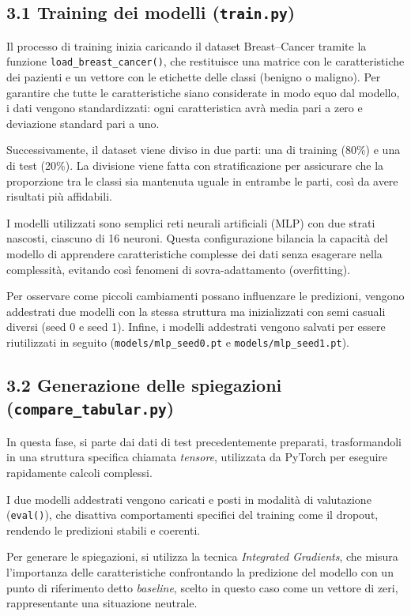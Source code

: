 \documentclass[a4paper,11pt]{article}
\begin{document}
\subsection*{3.1 Training dei modelli (\texttt{train.py})}
Il processo di training inizia caricando il dataset Breast–Cancer tramite la funzione \texttt{load\_breast\_cancer()}, che restituisce una matrice con le caratteristiche dei pazienti e un vettore con le etichette delle classi (benigno o maligno). Per garantire che tutte le caratteristiche siano considerate in modo equo dal modello, i dati vengono standardizzati: ogni caratteristica avrà media pari a zero e deviazione standard pari a uno.

Successivamente, il dataset viene diviso in due parti: una di training (80\%) e una di test (20\%). La divisione viene fatta con stratificazione per assicurare che la proporzione tra le classi sia mantenuta uguale in entrambe le parti, così da avere risultati più affidabili.

I modelli utilizzati sono semplici reti neurali artificiali (MLP) con due strati nascosti, ciascuno di 16 neuroni. Questa configurazione bilancia la capacità del modello di apprendere caratteristiche complesse dei dati senza esagerare nella complessità, evitando così fenomeni di sovra-adattamento (overfitting).

Per osservare come piccoli cambiamenti possano influenzare le predizioni, vengono addestrati due modelli con la stessa struttura ma inizializzati con semi casuali diversi (seed 0 e seed 1). Infine, i modelli addestrati vengono salvati per essere riutilizzati in seguito (\texttt{models/mlp\_seed0.pt} e \texttt{models/mlp\_seed1.pt}).

\subsection*{3.2 Generazione delle spiegazioni (\texttt{compare\_tabular.py})}

In questa fase, si parte dai dati di test precedentemente preparati, trasformandoli in una struttura specifica chiamata \emph{tensore}, utilizzata da PyTorch per eseguire rapidamente calcoli complessi.

I due modelli addestrati vengono caricati e posti in modalità di valutazione (\texttt{eval()}), che disattiva comportamenti specifici del training come il dropout, rendendo le predizioni stabili e coerenti.

Per generare le spiegazioni, si utilizza la tecnica \emph{Integrated Gradients}, che misura l'importanza delle caratteristiche confrontando la predizione del modello con un punto di riferimento detto \emph{baseline}, scelto in questo caso come un vettore di zeri, rappresentante una situazione neutrale.
\end{document}

